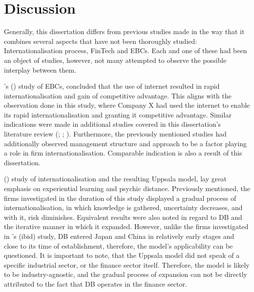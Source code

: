 \documentclass[11pt,a4paper]{article}
\begin{document}
{{{	
\newpage

\section{Discussion}
\vspace{-2mm}
\label{discussion}
\frenchspacing
{} \par %
Generally, this dissertation differs from previous studies made in the way that it combines several aspects that have not been thoroughly studied: Internationalisation process, FinTech and EBCs. Each and one of these had been an object of studies, however, not many attempted to observe the possible interplay between them. \par
\citeauthor{loaneCrossnationalComparisonInternationalisation2002}'s (\citeyear{loaneCrossnationalComparisonInternationalisation2002}) study of EBCs, concluded that the use of internet resulted in rapid internationalisation and gain of competitive advantage. This aligns with the observation done in this study, where Company X had used the internet to enable its rapid internationalisation and granting it competitive advantage. Similar indications were made in additional studies covered in this dissertation's literature review (\cite{fangParachutingInternationalizationStudy2017}; \cite{terziImpactEcommerceInternational2011}; \cite{petersenInternetForeignMarket2002}). Furthermore, the previously mentioned studies had additionally observed management structure and approach to be a factor playing a role in firm internationalisation. Comparable indication is also a result of this dissertation.  \par
\citeauthor{johansonInternationalizationProcessFirm1977} (\citeyear{johansonInternationalizationProcessFirm1977}) study of internationalisation and the resulting Uppsala model, lay great emphasis on experiential learning and psychic distance. Previously mentioned, the firms investigated in the duration of this study displayed a gradual process of internationalisation, in which knowledge is gathered, uncertainty decreases, and with it, risk diminishes. Equivalent results were also noted in regard to DB and the iterative manner in which it expanded. However, unlike the firms investigated in \citeauthor{johansonInternationalizationProcessFirm1977}'s (ibid) study, DB entered Japan and China in relatively early stages and close to its time of establishment, therefore, the model's applicability can be questioned. It is important to note, that the Uppsala model did not speak of a specific industrial sector, or the finance sector itself. Therefore, the model is likely to be industry-agnostic, and the gradual process of expansion can not be directly attributed to the fact that DB operates in the finance sector. \par
}}}
\end{document}
